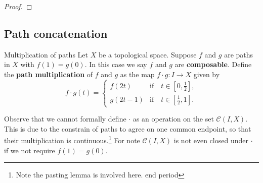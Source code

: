 \begin{proof}
    

\end{proof}



\subsection*{Path concatenation}

\begin{definition}{Multiplication of paths}{}
    Let \(X\) be a topological space. Suppose \(f\) and \(g\) are paths in \(X\) with \(f(1)=g(0)\). In this case we say \(f\) and \(g\) are \textbf{composable}.
    Define   the \textbf{path multiplication} of \(f\) and \(g\) as the map \(f\cdot g\colon I\to X\) given by 
      \[
        f \cdot g (t)= \begin{cases}
            f(2t)   &\text{if}\quad t\in [0,\frac{1}{2}],\\
            g(2t-1) &\text{if}\quad t\in [\frac{1}{2},1].
        \end{cases}
    \] 
\end{definition}

Observe that we cannot formally define \(\cdot\) as an operation on the set \(\mathcal{C}(I,X)\). This is due to the constrain of paths  to agree on one common endpoint, so that their multiplication is continuous.\footnote{Note the pasting lemma is involved here.  end period}
For note \(\mathcal{C}(I,X)\) is not even closed under \(\cdot\)  if we not require \(f(1)=g(0)\). 

